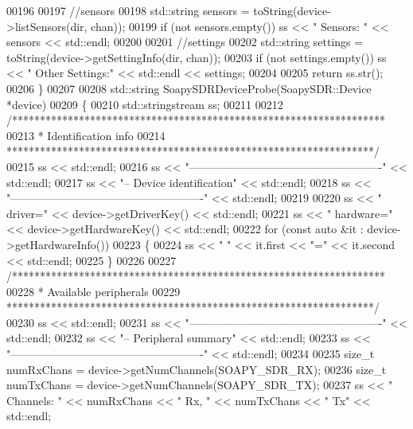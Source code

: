 \begin{DoxyCode}
00196 
00197     \textcolor{comment}{//sensors}
00198     std::string sensors = toString(device->listSensors(dir, chan));
00199     \textcolor{keywordflow}{if} (not sensors.empty()) ss << \textcolor{stringliteral}{"  Sensors: "} << sensors << std::endl;
00200 
00201     \textcolor{comment}{//settings}
00202     std::string settings = toString(device->getSettingInfo(dir, chan));
00203     \textcolor{keywordflow}{if} (not settings.empty()) ss << \textcolor{stringliteral}{"  Other Settings:"} << std::endl << settings;
00204 
00205     \textcolor{keywordflow}{return} ss.str();
00206 \}
00207 
00208 std::string SoapySDRDeviceProbe(SoapySDR::Device *device)
00209 \{
00210     std::stringstream ss;
00211 
00212     \textcolor{comment}{/*******************************************************************}
00213 \textcolor{comment}{     * Identification info}
00214 \textcolor{comment}{     ******************************************************************/}
00215     ss << std::endl;
00216     ss << \textcolor{stringliteral}{"----------------------------------------------------"} << std::endl;
00217     ss << \textcolor{stringliteral}{"-- Device identification"} << std::endl;
00218     ss << \textcolor{stringliteral}{"----------------------------------------------------"} << std::endl;
00219 
00220     ss << \textcolor{stringliteral}{"  driver="} << device->getDriverKey() << std::endl;
00221     ss << \textcolor{stringliteral}{"  hardware="} << device->getHardwareKey() << std::endl;
00222     \textcolor{keywordflow}{for} (\textcolor{keyword}{const} \textcolor{keyword}{auto} &it : device->getHardwareInfo())
00223     \{
00224         ss << \textcolor{stringliteral}{"  "} << it.first << \textcolor{stringliteral}{"="} << it.second << std::endl;
00225     \}
00226 
00227     \textcolor{comment}{/*******************************************************************}
00228 \textcolor{comment}{     * Available peripherals}
00229 \textcolor{comment}{     ******************************************************************/}
00230     ss << std::endl;
00231     ss << \textcolor{stringliteral}{"----------------------------------------------------"} << std::endl;
00232     ss << \textcolor{stringliteral}{"-- Peripheral summary"} << std::endl;
00233     ss << \textcolor{stringliteral}{"----------------------------------------------------"} << std::endl;
00234 
00235     \textcolor{keywordtype}{size\_t} numRxChans = device->getNumChannels(SOAPY_SDR_RX);
00236     \textcolor{keywordtype}{size\_t} numTxChans = device->getNumChannels(SOAPY_SDR_TX);
00237     ss << \textcolor{stringliteral}{"  Channels: "} << numRxChans << \textcolor{stringliteral}{" Rx, "} << numTxChans << \textcolor{stringliteral}{" Tx"} << std::endl;

\end{DoxyCode}
